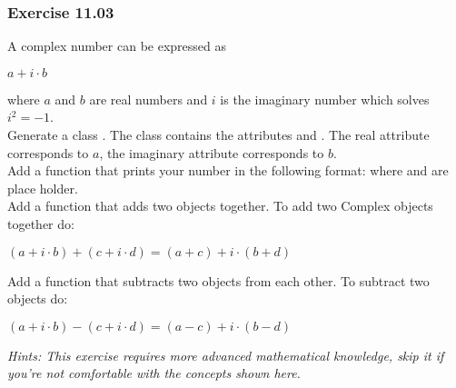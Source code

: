 \subsubsection*{Exercise 11.03 \red{[M]}}
A complex number can be expressed as
\begin{center}
	$a + i \cdot b$
\end{center}
where $a$ and $b$ are real numbers and $i$ is the imaginary number which solves $i^2 = -1$.\\
Generate a class {}. The class contains the attributes {} and {}. The real attribute corresponds to $a$, the imaginary attribute corresponds to $b$.\\
Add a function {} that prints your number in the following
format: {} where {} and {} are place holder.\\
Add a function {} that adds two {} objects together. To add
two Complex objects together do:
\begin{center}
	$(a + i \cdot b) + (c + i \cdot d) = (a + c) + i \cdot (b + d)$
\end{center}
Add a function {} that subtracts two {} objects from each other. To subtract two {} objects do:
\begin{center}
	$(a + i \cdot b) - (c + i \cdot d) = (a - c) + i \cdot (b - d)$
\end{center}

\textit{
Hints:
This exercise requires more advanced mathematical knowledge, skip it if you’re not comfortable with the concepts shown here.}